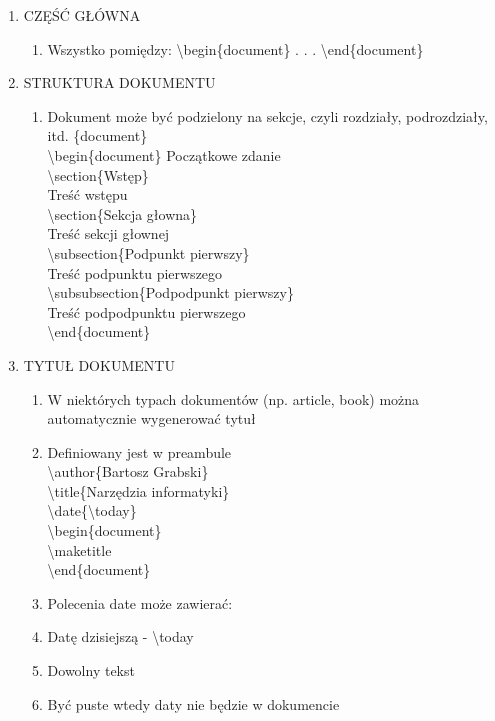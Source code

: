\documentclass[a4paper,twoside,onecolumn]{report}
\begin{document}
\begin{enumerate}
			\item CZĘŚĆ GŁÓWNA
			\begin{enumerate}
				\item Wszystko pomiędzy: \textbackslash begin\{document\} . . . \textbackslash end\{document\}
			\end{enumerate}

			\item STRUKTURA DOKUMENTU
			\begin{enumerate}
				\item Dokument może być podzielony na sekcje, czyli rozdziały, podrozdziały, itd. \{document\} \\
					\textbackslash begin\{document\}
						Początkowe zdanie \\
						\textbackslash section\{Wstęp\} \\
						Treść wstępu \\
						\textbackslash section\{Sekcja głowna\} \\
						Treść sekcji głownej \\
						\textbackslash subsection\{Podpunkt pierwszy\} \\
						Treść podpunktu pierwszego \\
						\textbackslash subsubsection\{Podpodpunkt pierwszy\} \\
						Treść podpodpunktu pierwszego \\
						\textbackslash end\{document\}
			\end{enumerate}


			\item TYTUŁ DOKUMENTU
			\begin{enumerate}[*]
				\item W niektórych typach dokumentów (np. article, book) można automatycznie wygenerować tytuł
				\item Definiowany jest w preambule\\
					\textbackslash author\{Bartosz Grabski\} \\ 
					\textbackslash title\{Narzędzia informatyki\} \\
					\textbackslash date\{\textbackslash today\} \\
					\textbackslash begin\{document\} \\
					\textbackslash maketitle \\
					\textbackslash end\{document\} \\
				\item Polecenia date może zawierać:
				\item Datę dzisiejszą - \textbackslash today
				\item Dowolny tekst
				\item Być puste wtedy daty nie będzie w dokumencie
			\end{enumerate}


\end{enumerate}
\end{document}
